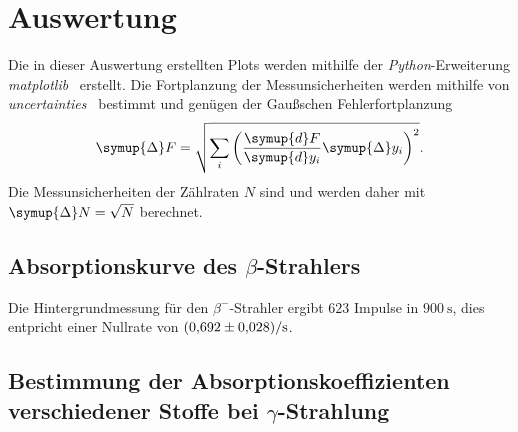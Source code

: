 \section{Auswertung}
\label{sec:Auswertung}
Die in dieser Auswertung erstellten Plots werden mithilfe der \textit{Python}-Erweiterung 
\textit{matplotlib}~\cite{matplotlib} erstellt. Die Fortplanzung der Messunsicherheiten werden mithilfe von
\textit{uncertainties}~\cite{uncertainties} bestimmt und genügen der Gaußschen Fehlerfortplanzung
\begin{equation*}
    \symup{\Delta} F = \sqrt{\sum_{i}\left(\frac{\symup{d}F}{\symup{d}y_{i}}\symup{\Delta} y_{i} \right)^2}.
\end{equation*}
Die Messunsicherheiten der Zählraten $N$ sind und werden daher mit $\symup{\Delta}N = \sqrt{N}$ berechnet.


\subsection{\texorpdfstring{Absorptionskurve des $\beta$-Strahlers}{Absorptionskurve des Beta-Strahlers}}
Die Hintergrundmessung für den $\beta^{-}$-Strahler ergibt $\num{623}$ Impulse in $\qty{900}{\second}$, dies entpricht 
einer Nullrate von $\qty{0.692+-0.028}{\per\second}$.

\subsection{\texorpdfstring{Bestimmung der Absorptionskoeffizienten verschiedener Stoffe bei $\gamma$-Strahlung}
{Bestimmung der Absorptionskoeffizienten verschiedener Stoffe bei Gamma-Strahlung}}